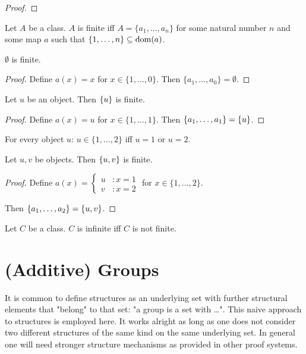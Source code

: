 \documentclass[english,11pt]{article}
\newcommand{\Seq}[2]{\{#1,\dots,#2\}}
\newcommand{\FinSet}[3]{\{#1_{#2},\dots,#1_{#3}\}}
\begin{document}
\begin{forthel}
\begin{proof}
\end{proof}

\begin{definition} Let $A$ be a class.
$A$ is finite iff
$A = \FinSet{a}{1}{n}$ for some natural number $n$ and some map $a$ such 
that $\Seq{1}{n} \subseteq \dom(a)$.
\end{definition}

\begin{lemma}
$\emptyset$ is finite.
\end{lemma}
\begin{proof}
Define $a(x) = x$ for $x \in \Seq{1}{0}$.
Then $\FinSet{a}{1}{0} = \emptyset$.
\end{proof}

\begin{lemma}
Let $u$ be an object. Then
$\{u\}$ is finite.
\end{lemma}
\begin{proof}
Define $a(x) = u$ for $x \in \Seq{1}{1}$.
Then $\FinSet{a}{1}{1} = \sing{u}$. 
\end{proof}

\begin{lemma}
For every object $u$:
$u \in \Seq{1}{2}$ iff $u = 1$ or $u = 2$.
\end{lemma}

\begin{lemma}
Let $u,v$ be objects. Then
$\{u,v\}$ is finite.
\end{lemma}

\begin{proof}
Define
$  a(x) =
    \begin{cases}
    u  & : x = 1 \\
    v  & : x = 2
    \end{cases} $
  for $x \in \Seq{1}{2}$.

Then $\FinSet{a}{1}{2} = \unp{u}{v}$. 
\end{proof}

\begin{definition} Let $C$ be a class.
$C$ is infinite iff $C$ is not finite.
\end{definition}

\end{forthel}

\section{(Additive) Groups}

It is common to define structures as an underlying set with further
structural elements that "belong" to that set: "a group is a set with
\dots". This naive approach to structures is employed here.
It works alright as long as one
does not consider two different structures of the same kind on the
same underlying set. In general one will need stronger structure mechanisms as 
provided in other proof systems.
  
\end{document}
